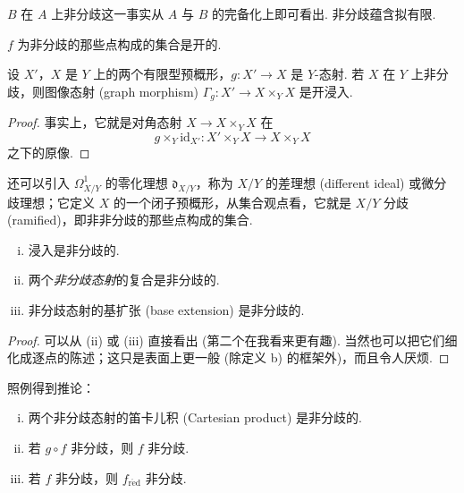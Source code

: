 \begin{remarkstar}
$B$ 在 $A$ 上非分歧这一事实从 $A$ 与 $B$ 的完备化上即可看出. 非分歧蕴含拟有限.
\end{remarkstar}

\begin{corollary}\label{cor:I.3.3}
$f$ 为非分歧的那些点构成的集合是开的.
\end{corollary}

\begin{corollary}\label{cor:I.3.4}
设 $X'$，$X$ 是 $Y$ 上的两个有限型预概形，$g \colon X' \to X$ 是 $Y$-态射. 若 $X$ 在 $Y$ 上非分歧，则图像态射 (graph morphism) $\Gamma_g \colon X' \to X \times_Y X$ 是开浸入.
\end{corollary}

\begin{proof}
事实上，它就是对角态射 $X \to X \times_Y X$ 在
\[
g \times_Y \mathrm{id}_{X'} \colon X' \times_Y X \longrightarrow X \times_Y X
\]
之下的原像.
\end{proof}

还可以引入 $\varOmega_{X/Y}^{1}$ 的零化理想 $\mathfrak{d}_{X/Y}$，称为 $X/Y$ 的差理想 (different ideal) 或微分歧理想；它定义 $X$ 的一个闭子预概形，从集合观点看，它就是 $X/Y$ 分歧 (ramified)，即非非分歧的那些点构成的集合.

\begin{proposition}\label{prop:I.3.5}
\begin{enumerate}[(i)]
\item 浸入是非分歧的.
\item 两个\emph{非分歧态射}的复合是非分歧的.
\item 非分歧态射的基扩张 (base extension) 是非分歧的.
\end{enumerate}
\end{proposition}

\begin{proof}
可以从 (ii) 或 (iii) 直接看出 (第二个在我看来更有趣). 当然也可以把它们细化成逐点的陈述；这只是表面上更一般 (除定义 b) 的框架外)，而且令人厌烦.
\end{proof}

照例得到推论：

\begin{corollary}\label{cor:I.3.6}
\begin{enumerate}[(iv)]
\item 两个非分歧态射的笛卡儿积 (Cartesian product) 是非分歧的.
\item 若 $g \circ f$ 非分歧，则 $f$ 非分歧.
\item 若 $f$ 非分歧，则 $f_{\mathrm{r\acute{e}d}}$ 非分歧.
\end{enumerate}
\end{corollary}

